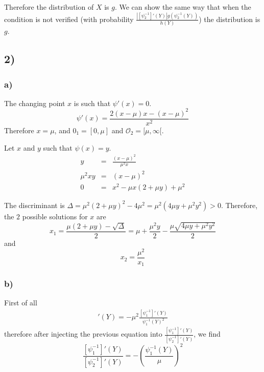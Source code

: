 Therefore the distribution of $X$ is $g$. We can show the same way that when the condition is not verified (with probability $\frac{|[\psi_2^{-1}]'(Y)| g(\psi_2^{-1}(Y))}{h(Y)}$) the distribution is $g$.

\subsection*{2)}
\subsubsection*{a)}

The changing point $x$ is such that $\psi'(x) = 0$.
\[\psi'(x) = \frac{2(x-\mu)x - (x-\mu)^2}{x^2}\]
Therefore $x = \mu$, and $\mathcal{0}_1 = [0,\mu]$ and $\mathcal{O}_2 = [\mu,\infty[$.

Let $x$ and $y$ such that $\psi(x) = y$.
\begin{eqnarray*}
	y &=& \frac{(x-\mu)^2}{\mu^2x}\\
	\mu^2xy &=& (x-\mu)^2\\
	0 &=& x^2-\mu x(2 + \mu y) + \mu^2
\end{eqnarray*}

The discriminant is $\Delta = \mu^2 (2 + \mu y)^2 - 4\mu^2 = \mu^2 (4 \mu y + \mu^2 y^2) > 0$.
Therefore, the $2$ possible solutions for $x$ are
\[x_1 = \frac{\mu(2 + \mu y) - \sqrt{\Delta}}{2} = \mu + \frac{\mu^2 y}{2} - \frac{\mu \sqrt{4 \mu y + \mu^2 y^2}}{2}\]
and
\[x_2 = \frac{\mu^2}{x_1}\]

\subsubsection*{b)}

First of all 
\begin{eqnarray*}
	[\psi_2^{-1}]'(Y) = - \mu^2 \frac{[\psi_1^{-1}]'(Y)}{\psi_1^{-1}(Y)^2}
\end{eqnarray*}
therefore after injecting the previous equation into $\frac{[\psi_1^{-1}]'(Y)}{[\psi_2^{-1}]'(Y)}$, we find 
\[\frac{[\psi_1^{-1}]'(Y)}{[\psi_2^{-1}]'(Y)} = - \left(\frac{\psi_1^{-1}(Y)}{\mu}\right)^2\]



